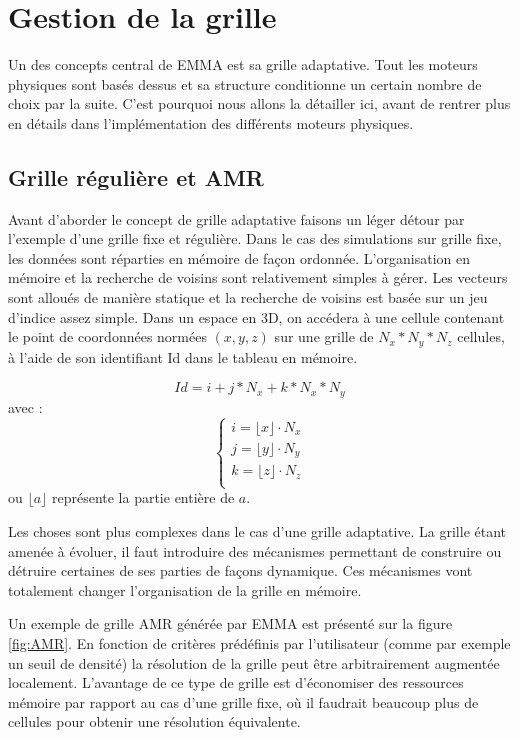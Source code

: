 \section{Gestion de la grille}
\label{sec_gestion_grille}

Un des concepts central de EMMA est sa grille adaptative.
Tout les moteurs physiques sont basés dessus et sa structure conditionne un certain nombre de choix par la suite.
C'est pourquoi nous allons la détailler ici, avant de rentrer plus en détails dans l'implémentation des différents moteurs physiques.

\subsection{Grille régulière et AMR}
Avant d'aborder le concept de grille adaptative faisons un léger détour par l'exemple d'une grille fixe et régulière.
Dans le cas des simulations sur grille fixe, les données sont réparties en mémoire de façon ordonnée.
L'organisation en mémoire et la recherche de voisins sont relativement simples à gérer.
Les vecteurs sont alloués de manière statique et la recherche de voisins est basée sur un jeu d'indice assez simple.
Dans un espace en 3D, on accédera à une cellule contenant le point de coordonnées normées $(x,y,z)$ sur une grille de $N_x*N_y*N_z$ cellules, à l'aide de son identifiant Id dans le tableau en mémoire.

\begin{equation}
Id = i + j*N_x + k * N_x*N_y
\end{equation}
avec :
\begin{equation}
\begin{cases}
i=\lfloor x \rfloor \cdot N_x \\
j=\lfloor y \rfloor \cdot N_y \\
k=\lfloor z \rfloor \cdot N_z \\
\end{cases}
\end{equation}
ou $\lfloor a \rfloor$ représente la partie entière de $a$.

Les choses sont plus complexes dans le cas d'une grille adaptative.
La grille étant amenée à évoluer, il faut introduire des mécanismes permettant de construire ou détruire certaines de ses parties de façons dynamique.
Ces mécanismes vont totalement changer l'organisation de la grille en mémoire.

Un exemple de grille \ac{AMR} générée par EMMA est présenté sur la figure \ref{fig:AMR}.
En fonction de critères prédéfinis par l'utilisateur (comme par exemple un seuil de densité) la résolution de la grille peut être arbitrairement augmentée localement.
L'avantage de ce type de grille est d'économiser des ressources mémoire par rapport au cas d'une grille fixe, où il faudrait beaucoup plus de cellules pour obtenir une résolution équivalente.

